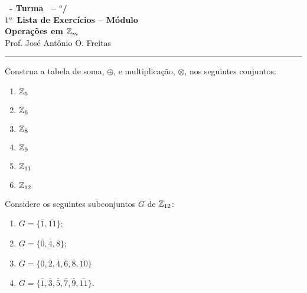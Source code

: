 \documentclass[12pt]{exam}
\begin{document}
    \begin{center}
    {\Large\bf \disciplina\ - Turma \turma\ -- \semestre$^{o}$/\ano} \\ \vspace{9pt} {\large\bf
        $1^a$ Lista de Exercícios -- Módulo \numeromodulo\\ Operações em $\mathbb{Z}_m$}\\ \vspace{9pt} Prof. José Antônio O. Freitas
    \end{center}
    \hrule

    \vspace{.6cm}

    \questao{} Construa a tabela de soma, $\oplus$, e multiplicação, $\otimes$, nos seguintes conjuntos:
    \begin{multicols}{3}
        \begin{enumerate}[label=({\alph*})]
            \item $\mathbb{Z}_5$
            \item $\mathbb{Z}_6$
            \item $\mathbb{Z}_8$
            \item $\mathbb{Z}_9$
            \item $\mathbb{Z}_{11}$
            \item $\mathbb{Z}_{12}$
        \end{enumerate}
    \end{multicols}

    \vspace{.3cm}

    \questao{} Considere os seguintes subconjuntos $G$ de $\mathbb{Z}_{12}$:
    \begin{multicols}{2}
        \begin{enumerate}[label=({\alph*})]
            \item $G=\{\overline{1},\overline{11}\}$;

            \item $G=\{\overline{0},\overline{4},\overline{8}\}$;

            \item $G=\{\overline{0},\overline{2},\overline{4},\overline{6},\overline{8},\overline{10}\}$

            \item $G=\{\overline{1}, \overline{3},\overline{5},\overline{7},\overline{9},\overline{11}\}$.
        \end{enumerate}
    \end{multicols}
\end{document}

